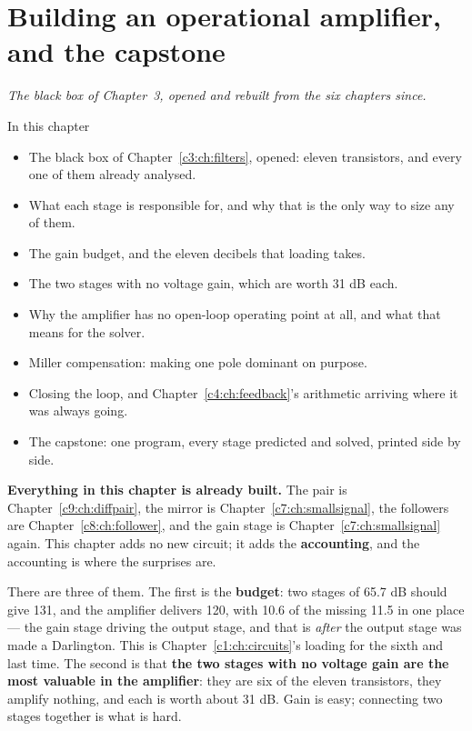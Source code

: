 
\chapter{Building an operational amplifier, and the capstone}
\label{c10:ch:amplifier}

{\large\itshape The black box of Chapter~3, opened and rebuilt from the six chapters since.\par}

\begin{chapterbox}{In this chapter}
\begin{itemize}
  \item The black box of Chapter~\ref{c3:ch:filters}, opened: eleven transistors, and every one of
    them already analysed.
  \item What each stage is responsible for, and why that is the only way to size any of them.
  \item The gain budget, and the eleven decibels that loading takes.
  \item The two stages with no voltage gain, which are worth 31 dB each.
  \item Why the amplifier has no open-loop operating point at all, and what that means for the
    solver.
  \item Miller compensation: making one pole dominant on purpose.
  \item Closing the loop, and Chapter~\ref{c4:ch:feedback}'s arithmetic arriving where it was
    always going.
  \item The capstone: one program, every stage predicted and solved, printed side by side.
\end{itemize}
\end{chapterbox}

\textbf{Everything in this chapter is already built.} The pair is Chapter~\ref{c9:ch:diffpair}, the
mirror is Chapter~\ref{c7:ch:smallsignal}, the followers are Chapter~\ref{c8:ch:follower}, and the
gain stage is Chapter~\ref{c7:ch:smallsignal} again. This chapter adds no new circuit; it adds the
\textbf{accounting}, and the accounting is where the surprises are.

There are three of them. The first is the \textbf{budget}: two stages of 65.7 dB should give 131,
and the amplifier delivers 120, with 10.6 of the missing 11.5 in one place --- the gain stage
driving the output stage, and that is \emph{after} the output stage was made a Darlington. This is
Chapter~\ref{c1:ch:circuits}'s loading for the sixth and last time. The second is that \textbf{the
two stages with no voltage gain are the most valuable in the amplifier}: they are six of the eleven
transistors, they amplify nothing, and each is worth about 31 dB. Gain is easy; connecting two
stages together is what is hard.

